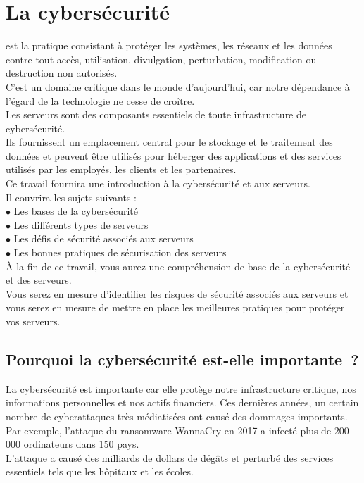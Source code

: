 \section{La cybersécurité }
 est la pratique consistant à protéger les systèmes, les réseaux et les données contre tout accès, utilisation, divulgation, perturbation, modification ou destruction non autorisés.\\
 C'est un domaine critique dans le monde d’aujourd’hui, car notre dépendance à l'égard de la technologie ne cesse de croître.\\

Les serveurs sont des composants essentiels de toute infrastructure de cybersécurité.\\ Ils fournissent un emplacement central pour le stockage et le traitement des données et peuvent être utilisés pour héberger des applications et des services utilisés par les employés, les clients et les partenaires.\\

Ce travail fournira une introduction à la cybersécurité et aux serveurs.\\
 Il couvrira les sujets suivants :\\

$\bullet$ Les bases de la cybersécurité\\
$\bullet$ Les différents types de serveurs\\
$\bullet$ Les défis de sécurité associés aux serveurs\\
$\bullet$ Les bonnes pratiques de sécurisation des serveurs\\

À la fin de ce travail, vous aurez une compréhension de base de la cybersécurité et des serveurs.\\ Vous serez en mesure d'identifier les risques de sécurité associés aux serveurs et vous serez en mesure de mettre en place les meilleures pratiques pour protéger vos serveurs.\\

 \paragraph{ } \subsection{ Pourquoi la cybersécurité est-elle importante ? }   

La cybersécurité est importante car elle protège notre infrastructure critique, nos informations personnelles et nos actifs financiers. Ces dernières années, un certain nombre de cyberattaques très médiatisées ont causé des dommages importants.\\
 Par exemple, l'attaque du ransomware WannaCry en 2017 a infecté plus de 200 000 ordinateurs dans 150 pays.\\ L'attaque a causé des milliards de dollars de dégâts et perturbé des services essentiels tels que les hôpitaux et les écoles.\\

